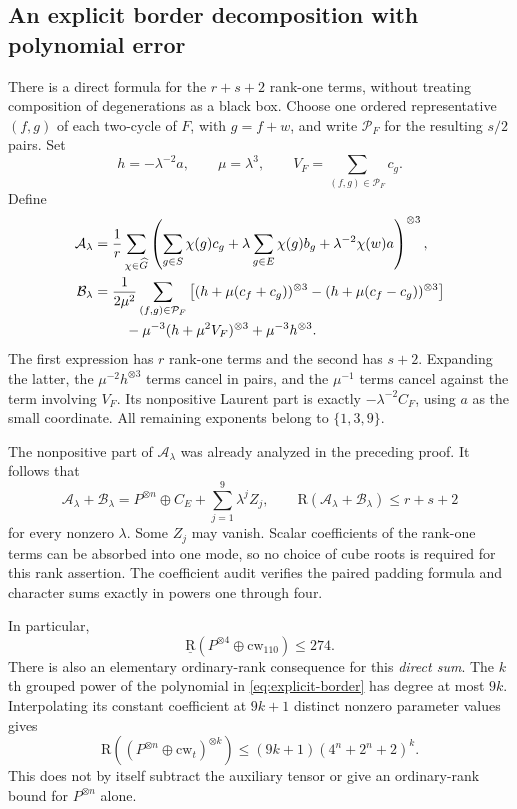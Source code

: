 \documentclass[11pt]{article}
\theoremstyle{definition}\newtheorem{definition}[theorem]{Definition}
\newcommand{\R}{\mathrm R}
\newcommand{\BR}{\underline{\mathrm R}}
\newcommand{\cw}{\mathrm{cw}}
\begin{document}
\subsection{An explicit border decomposition with polynomial error}
There is a direct formula for the $r+s+2$ rank-one terms, without treating composition of degenerations as a black box. Choose one ordered representative $(f,g)$ of each two-cycle of $F$, with $g=f+w$, and write $\mathcal P_F$ for the resulting $s/2$ pairs. Set
\[
h=-\lambda^{-2}a,\qquad \mu=\lambda^3,\qquad V_F=\sum_{(f,g)\in\mathcal P_F}c_g.
\]
Define
\begin{align*}
\mathcal A_\lambda&=\frac1r\sum_{\chi\in\widehat G}
\left(\sum_{g\in S}\chi(g)c_g+
\lambda\sum_{g\in E}\chi(g)b_g+\lambda^{-2}\chi(w)a\right)^{\otimes3},\\
\mathcal B_\lambda&=
\frac1{2\mu^2}\sum_{(f,g)\in\mathcal P_F}
\left[(h+\mu(c_f+c_g))^{\otimes3}-(h+\mu(c_f-c_g))^{\otimes3}\right]\\
&\hspace{8mm}-\mu^{-3}(h+\mu^2V_F)^{\otimes3}+\mu^{-3}h^{\otimes3}.
\end{align*}
The first expression has $r$ rank-one terms and the second has $s+2$. Expanding the latter, the $\mu^{-2}h^{\otimes3}$ terms cancel in pairs, and the $\mu^{-1}$ terms cancel against the term involving $V_F$. Its nonpositive Laurent part is exactly $-\lambda^{-2}C_F$, using $a$ as the small coordinate. All remaining exponents belong to $\{1,3,9\}$.

The nonpositive part of $\mathcal A_\lambda$ was already analyzed in the preceding proof. It follows that
\begin{equation}\label{eq:explicit-border}
\mathcal A_\lambda+\mathcal B_\lambda
=P^{\otimes n}\oplus C_E+\sum_{j=1}^{9}\lambda^j Z_j,
\qquad \R(\mathcal A_\lambda+\mathcal B_\lambda)\le r+s+2
\end{equation}
for every nonzero $\lambda$. Some $Z_j$ may vanish. Scalar coefficients of the rank-one terms can be absorbed into one mode, so no choice of cube roots is required for this rank assertion. The coefficient audit verifies the paired padding formula and character sums exactly in powers one through four.

In particular,
\[
\BR(P^{\otimes4}\oplus\cw_{110})\le274.
\]
There is also an elementary ordinary-rank consequence for this \emph{direct sum}. The $k$th grouped power of the polynomial in \eqref{eq:explicit-border} has degree at most $9k$. Interpolating its constant coefficient at $9k+1$ distinct nonzero parameter values gives
\[
\R\!\left((P^{\otimes n}\oplus\cw_t)^{\otimes k}\right)
\le(9k+1)(4^n+2^n+2)^k.
\]
This does not by itself subtract the auxiliary tensor or give an ordinary-rank bound for $P^{\otimes n}$ alone.
\end{document}
